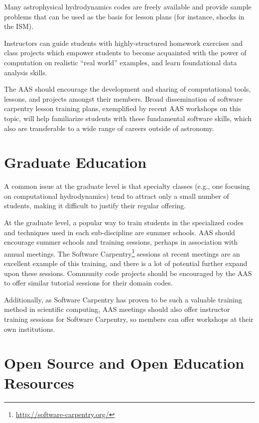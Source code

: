 \documentclass[11pt]{article}
\begin{document}
Many astrophysical hydrodynamics codes are freely available and
provide sample problems that can be used as the basis for lesson
plans (for instance, shocks in the ISM).

Instructors can guide students with highly-structured homework
exercises and class projects which empower students to become
acquainted with the power of computation on realistic ``real world''
examples, and learn foundational data analysis skills.

The AAS should encourage the development and sharing of computational
tools, lessons, and projects amongst their members. Broad
dissemination of software carpentry lesson training plans, exemplified
by recent AAS workshops on this topic, will help familiarize students
with these fundamental software skills, which also are transferable to
a wide range of careers outside of astronomy.





\section{Graduate Education}

A common issue at the graduate level is that specialty classes (e.g.,
one focusing on computational hydrodynamics) tend to attract only a
small number of students, making it difficult to justify their regular
offering.

At the graduate level, a popular way to train students in the
specialized codes and techniques used in each sub-discipline are summer
schools.  AAS should encourage summer schools and training sessions,
perhaps in association with annual meetings.  The Software
Carpentry\footnote{\url{http://software-carpentry.org/}} sessions at
recent meetings are an excellent example of this training, and there is a lot of
potential further expand upon these sessions.  Community code projects should be
encouraged by the AAS to offer similar tutorial sessions for their domain
codes.

Additionally, as Software Carpentry has proven to be such a valuable
training method in scientific computing, AAS meetings should also
offer instructor training sessions for Software Carpentry, so members
can offer workshops at their own institutions.


\section{Open Source and Open Education Resources}
\end{document}
